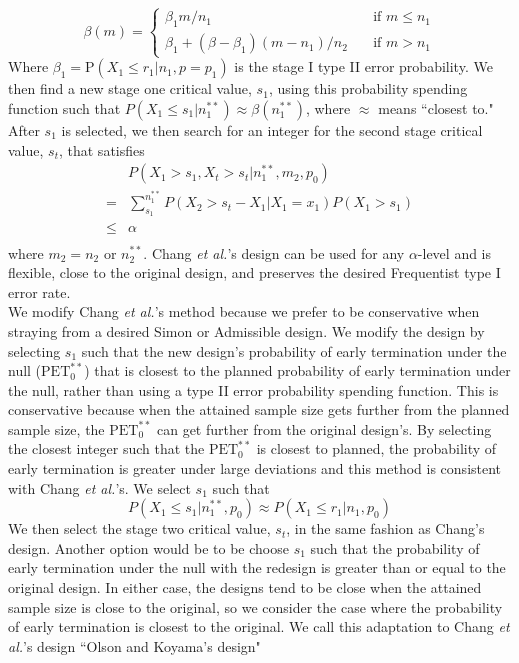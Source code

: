 \documentclass[12pt]{report}\usepackage[]{graphicx}\usepackage[]{color}
\newlength{\li}\setlength{\li}{14.48pt}
\newlength{\di}\setlength{\di}{-3.5mm}
\begin{document}
$$
\beta(m) = \left\{
        \begin{array}{ll}
            \beta_1 m/n_1 & \quad \text{if } m\leq n_1 \\
            \beta_1 + (\beta - \beta_1)(m - n_1)/n_2 & \quad \text{if } m > n_1
        \end{array}
    \right.
$$
Where $\beta_1 = \mbox{P}(X_1 \leq r_1 \vert n_1, p = p_1)$ is the stage I type II error probability.
We then find a new stage one critical value, $s_1$, using this probability spending function such that $P(X_1 \leq s_1 | n_1^{\ast\ast}) \approx \beta(n_1^{\ast\ast})$, where $\approx$ means ``closest to." After $s_1$ is selected, we then search for an integer for the second stage critical value, $s_t$, that satisfies
\begin{equation*}
\begin{aligned}
& P(X_1 > s_1, X_t > s_t | n_1^{\ast\ast}, m_2, p_0) \\
= & \sum_{s_1}^{n_1^{\ast\ast}} P(X_2 > s_t - X_1 | X_1 = x_1) P(X_1 > s_1) \\
 \leq & \alpha \\
\end{aligned}
\end{equation*}
where $m_2 = n_2$ or $n_2^{\ast\ast}$. 
Chang \textit{et al.}'s design can be used for any $\alpha$-level and is flexible, close to the original design, and preserves the desired Frequentist type I error rate. \\
We modify Chang \textit{et al.}'s method because we prefer to be conservative when straying from a desired Simon or Admissible design. We modify the design by selecting $s_1$ such that the new design's probability of early termination under the null ($\mbox{PET}_0^{\ast\ast}$) that is closest to the planned probability of early termination under the null, rather than using a type II error probability spending function. This is conservative because when the attained sample size gets further from the planned sample size, the $\mbox{PET}_0^{\ast\ast}$ can get further from the original design's. By selecting the closest integer such that the $\mbox{PET}_0^{\ast\ast}$ is closest to planned, the probability of early termination is greater under large deviations and this method is consistent with Chang \textit{et al.}'s. We select $s_1$ such that $$P(X_1 \leq s_1 | n_1^{\ast\ast}, p_0) \approx P(X_1 \leq r_1 | n_1, p_0)$$ We then select the stage two critical value, $s_t$, in the same fashion as Chang's design. Another option would be to be choose $s_1$ such that the probability of early termination under the null with the redesign is greater than or equal to the original design. In either case, the designs tend to be close when the attained sample size is close to the original, so we consider the case where the probability of early termination is closest to the original. We call this adaptation to Chang \textit{et al.}'s design ``Olson and Koyama's design"  
\end{document}
